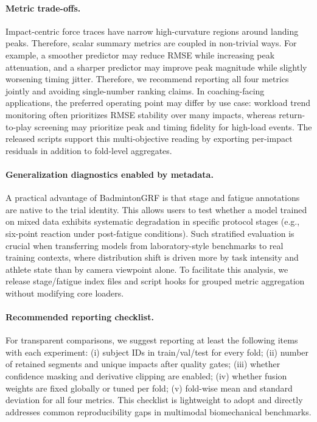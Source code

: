 \documentclass[sigconf,screen]{acmart}
\begin{document}
\paragraph{Metric trade-offs.}
Impact-centric force traces have narrow high-curvature regions around landing peaks.
Therefore, scalar summary metrics are coupled in non-trivial ways.
For example, a smoother predictor may reduce RMSE while increasing peak attenuation, and a sharper predictor may improve peak magnitude while slightly worsening timing jitter.
Therefore, we recommend reporting all four metrics jointly and avoiding single-number ranking claims.
In coaching-facing applications, the preferred operating point may differ by use case: workload trend monitoring often prioritizes RMSE stability over many impacts, whereas return-to-play screening may prioritize peak and timing fidelity for high-load events.
The released scripts support this multi-objective reading by exporting per-impact residuals in addition to fold-level aggregates.

\paragraph{Generalization diagnostics enabled by metadata.}
A practical advantage of BadmintonGRF is that stage and fatigue annotations are native to the trial identity.
This allows users to test whether a model trained on mixed data exhibits systematic degradation in specific protocol stages (e.g., six-point reaction under post-fatigue conditions).
Such stratified evaluation is crucial when transferring models from laboratory-style benchmarks to real training contexts, where distribution shift is driven more by task intensity and athlete state than by camera viewpoint alone.
To facilitate this analysis, we release stage/fatigue index files and script hooks for grouped metric aggregation without modifying core loaders.

\paragraph{Recommended reporting checklist.}
For transparent comparisons, we suggest reporting at least the following items with each experiment: (i) subject IDs in train/val/test for every fold; (ii) number of retained segments and unique impacts after quality gates; (iii) whether confidence masking and derivative clipping are enabled; (iv) whether fusion weights are fixed globally or tuned per fold; (v) fold-wise mean and standard deviation for all four metrics.
This checklist is lightweight to adopt and directly addresses common reproducibility gaps in multimodal biomechanical benchmarks.
\end{document}
